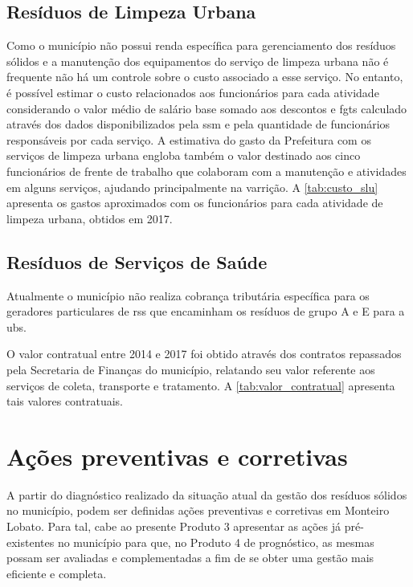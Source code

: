 \subsection{Resíduos de Limpeza Urbana}
Como o município não possui renda específica para gerenciamento dos resíduos sólidos e a manutenção dos equipamentos do serviço de limpeza urbana não é frequente não há um controle sobre o custo associado a esse serviço. No entanto, é possível estimar o custo relacionados aos funcionários para cada atividade considerando o valor médio de salário base somado aos descontos e \gls{fgts} calculado através dos dados disponibilizados pela \gls{ssm} e pela quantidade de funcionários responsáveis por cada serviço. A estimativa do gasto da Prefeitura com os serviços de limpeza urbana engloba também o valor destinado aos cinco funcionários de frente de trabalho que colaboram com a manutenção e atividades em alguns serviços, ajudando principalmente na varrição.  A \autoref{tab:custo_slu} apresenta os gastos aproximados com os funcionários para cada atividade de limpeza urbana, obtidos em 2017.



\subsection{Resíduos de Serviços de Saúde}
Atualmente o município não realiza cobrança tributária específica para os geradores particulares de \gls{rss} que encaminham os resíduos de grupo A e E para a \gls{ubs}.

O valor contratual entre 2014 e 2017 foi obtido através dos contratos repassados pela Secretaria de Finanças do município, relatando seu valor referente aos serviços de coleta, transporte e tratamento. A \autoref{tab:valor_contratual} apresenta tais valores contratuais.



\newpage
\section{Ações preventivas e corretivas}
A partir do diagnóstico realizado da situação atual da gestão dos resíduos sólidos no município, podem ser definidas ações preventivas e corretivas em Monteiro Lobato. Para tal, cabe ao presente Produto 3 apresentar as ações já pré-existentes no município para que, no Produto 4 de prognóstico, as mesmas possam ser avaliadas e complementadas a fim de se obter uma gestão mais eficiente e completa.

